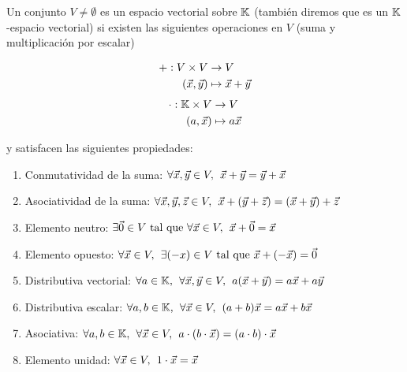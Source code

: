 \documentclass[../algebra_lineal.tex]{subfiles}
\begin{document}
\begin{definition}
    \label{vector_space_definition}
    Un conjunto $V \neq \emptyset$ es un espacio vectorial sobre $\mathbb{K}$ (también diremos que es un $\mathbb{K}$-espacio vectorial) si existen las siguientes operaciones en $V$ (suma y multiplicación por escalar) 
    
    \begin{multicols}{2}
        \noindent
        \begin{align*} +: V \times V &\to V \\
                (\vec{x}, \vec{y}) &\mapsto \vec{x} + \vec{y}
        \end{align*}
        \begin{align*}
            \cdot: \mathbb{K} \times V &\to V \\
                (a, \vec{x}) &\mapsto a \vec{x}
        \end{align*}
    \end{multicols}

    y satisfacen las siguientes propiedades:

    \begin{enumerate}
        \item Conmutatividad de la suma: $\forall \vec{x}, \vec{y} \in V, \hspace{1.5mm} \vec{x} + \vec{y} = \vec{y} + \vec{x}$
        \item Asociatividad de la suma: $\forall \vec{x}, \vec{y}, \vec{z} \in V, \hspace{1.5mm} \vec{x} + (\vec{y} + \vec{z}) = (\vec{x} + \vec{y}) + \vec{z}$
        \item \label{espacio_vectorial_neutro} Elemento neutro: $\exists \vec{0} \in V \mathrm{\,\, tal \,\, que \,\,} \forall \vec{x} \in V, \hspace{1.5mm} \vec{x} + \vec{0} = \vec{x}$
        \item \label{espacio_vectorial_opuesto} Elemento opuesto: $\forall \vec{x} \in V, \hspace{1.5mm} \exists {({-x})} \in V \mathrm{\,\, tal \,\, que \,\,}  \vec{x} + (-\vec{x}) = \vec{0}$
        \item Distributiva vectorial: $\forall a \in \mathbb{K}, \hspace{1.5mm} \forall \vec{x}, \vec{y} \in V, \hspace{1.5mm} a(\vec{x} + \vec{y}) = a\vec{x} + a \vec{y}$
        \item Distributiva escalar: $\forall a, b\in \mathbb{K}, \hspace{1.5mm} \forall \vec{x} \in V, \hspace{1.5mm} (a+b)\vec{x} = a\vec{x} + b\vec{x}$ 
        \item Asociativa: $\forall a, b \in \mathbb{K}, \hspace{1.5mm} \forall \vec{x} \in V, \hspace{1.5mm} a \cdot (b \cdot \vec{x}) = (a\cdot b) \cdot \vec{x} $
        \item \label{espacio_vectorial_unidad} Elemento unidad: $\forall \vec{x} \in V, \hspace{1.5mm} 1 \cdot \vec{x} = \vec{x}$ 
    \end{enumerate}

\end{definition}
\end{document}

